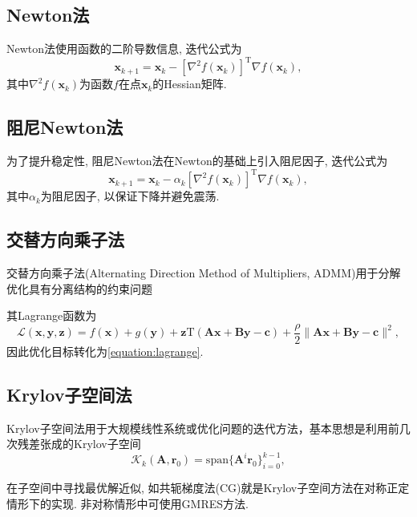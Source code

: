 \subsection{Newton法}

Newton法使用函数的二阶导数信息, 迭代公式为
\begin{equation*}
    \bm{x}_{k+1}=\bm{x}_k-\left[\nabla^2f(\bm{x}_k)\right]^\mathrm{T}\nabla f(\bm{x}_k),
\end{equation*}
其中$\nabla^2f(\bm{x}_k)$为函数$f$在点$\bm{x}_k$的Hessian矩阵.

\subsection{阻尼Newton法}

为了提升稳定性, 阻尼Newton法在Newton的基础上引入阻尼因子, 迭代公式为
\begin{equation*}
    \bm{x}_{k+1}=\bm{x}_k-\alpha_k\left[\nabla^2f(\bm{x}_k)\right]^\mathrm{T}\nabla f(\bm{x}_k),
\end{equation*}
其中$\alpha_k$为阻尼因子, 以保证下降并避免震荡.

\subsection{交替方向乘子法}

交替方向乘子法(Alternating Direction Method of Multipliers, ADMM)用于分解优化具有分离结构的约束问题

其Lagrange函数为
\begin{equation}
    \mathcal{L}(\bm{x},\bm{y},\bm{z})=f(\bm{x})+g(\bm{y})+\bm{z}\mathrm{T}(\bm{Ax}+\bm{By}-\bm{c})+\frac{\rho}{2}\|\bm{Ax}+\bm{By}-\bm{c}\|^2,
    \label{equation:lagrange}
\end{equation}
因此优化目标转化为\cref{equation:lagrange}.

\subsection{Krylov子空间法}

Krylov子空间法用于大规模线性系统或优化问题的迭代方法，基本思想是利用前几次残差张成的Krylov子空间
\begin{equation*}
    \mathcal{K}_k(\bm{A},\bm{r}_0)=\mathrm{span}\{\bm{A}^i\bm{r}_0\}_{i=0}^{k-1},
\end{equation*}

在子空间中寻找最优解近似, 如共轭梯度法(CG)就是Krylov子空间方法在对称正定情形下的实现.
非对称情形中可使用GMRES方法.
